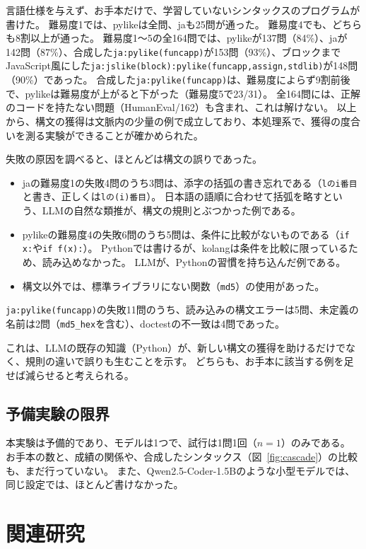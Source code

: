 \documentclass{ipsjprosym}
\begin{document}
言語仕様を与えず、お手本だけで、学習していないシンタックスのプログラムが書けた。
難易度1では、pylikeは全問、jaも25問が通った。
難易度4でも、どちらも8割以上が通った。
難易度1〜5の全164問では、pylikeが137問（84\%）、jaが142問（87\%）、合成した\verb|ja:pylike(funcapp)|が153問（93\%）、ブロックまでJavaScript風にした\verb|ja:jslike(block):pylike(funcapp,assign,stdlib)|が148問（90\%）であった。
合成した\verb|ja:pylike(funcapp)|は、難易度によらず9割前後で、pylikeは難易度が上がると下がった（難易度5で23/31）。
全164問には、正解のコードを持たない問題（HumanEval/162）も含まれ、これは解けない。
以上から、構文の獲得は文脈内の少量の例で成立しており、本処理系で、獲得の度合いを測る実験ができることが確かめられた。

失敗の原因を調べると、ほとんどは構文の誤りであった。
\begin{itemize}
  \item jaの難易度1の失敗4問のうち3問は、添字の括弧の書き忘れである（\verb|lのi番目|と書き、正しくは\verb|lの(i)番目|）。
    日本語の語順に合わせて括弧を略すという、LLMの自然な類推が、構文の規則とぶつかった例である。
  \item pylikeの難易度4の失敗6問のうち5問は、条件に比較がないものである（\verb|if x:|や\verb|if f(x):|）。
    Pythonでは書けるが、kolangは条件を比較に限っているため、読み込めなかった。
    LLMが、Pythonの習慣を持ち込んだ例である。
  \item 構文以外では、標準ライブラリにない関数（\verb|md5|）の使用があった。
\end{itemize}
\verb|ja:pylike(funcapp)|の失敗11問のうち、読み込みの構文エラーは5問、未定義の名前は2問（\verb|md5_hex|を含む）、doctestの不一致は4問であった。

これは、LLMの既存の知識（Python）が、新しい構文の獲得を助けるだけでなく、規則の違いで誤りも生むことを示す。
どちらも、お手本に該当する例を足せば減らせると考えられる。

\subsection{予備実験の限界}

本実験は予備的であり、モデルは1つで、試行は1問1回（$n=1$）のみである。
お手本の数と、成績の関係や、合成したシンタックス（図~\ref{fig:cascade}）の比較も、まだ行っていない。
また、Qwen2.5-Coder-1.5Bのような小型モデルでは、同じ設定では、ほとんど書けなかった。

\section{関連研究}
\label{sec:related}
\end{document}
